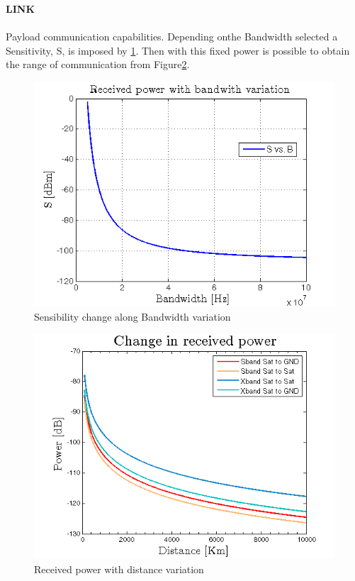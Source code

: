 \textbf{LINK} 
\paragraph{} Payload communication capabilities. Depending onthe Bandwidth selected a Sensitivity, S, is imposed by \ref{SvsB}. Then with this fixed power is possible to obtain the range of communication from Figure\ref{friis}.
\begin{figure}[h]
	\includegraphics[scale=0.9]{./sections/SatelliteConfiguration/SvsB}
	\centering
	\caption{Sensibility change along Bandwidth variation}
	\label{SvsB}
\end{figure}
\clearpage
\begin{figure}[h]
	\includegraphics[scale=1.2]{./sections/SatelliteConfiguration/friisCases}
	\centering
	\caption{Received power with distance variation}
	\label{friis}
\end{figure}
\clearpage
